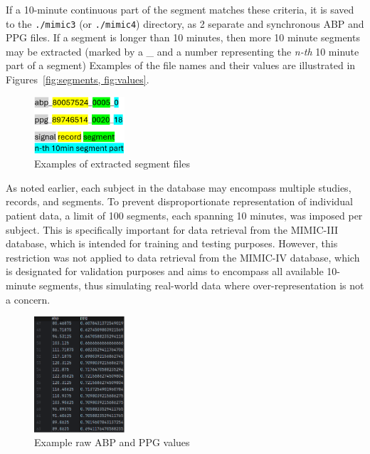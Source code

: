 If a 10-minute continuous part of the segment matches these criteria, it is saved to the \texttt{./mimic3} (or \texttt{./mimic4}) directory, as 2 separate and synchronous ABP and PPG files.
If a segment is longer than 10 minutes, then more 10 minute segments may be extracted (marked by a \_ and a number representing the \textit{n-th} 10 minute part of a segment)
Examples of the file names and their values are illustrated in Figures~\ref{fig:segments, fig:values}.

\begin{figure}
    \vspace*{-10mm}
    \begin{center}
        \includegraphics[width=0.3\textwidth]{images/methods/segments}
    \end{center}
    \vspace*{-7mm}
    \captionsetup{format=plain, justification=centering}
    \caption{\small Examples of extracted segment files}
    \label{fig:segments}
\end{figure}

As noted earlier, each subject in the database may encompass multiple studies, records, and segments.
To prevent disproportionate representation of individual patient data, a limit of 100 segments, each spanning 10 minutes, was imposed per subject.
This is specifically important for data retrieval from the MIMIC-III database, which is intended for training and testing purposes.
However, this restriction was not applied to data retrieval from the MIMIC-IV database, which is designated for validation purposes and aims to encompass all available 10-minute segments, thus simulating real-world data where over-representation is not a concern.

\begin{figure}
    \vspace*{-5mm}
    \begin{center}
        \includegraphics[width=0.3\textwidth]{images/methods/values}
    \end{center}
    \vspace*{-7mm}
    \captionsetup{format=plain, justification=centering}
    \caption{\small Example raw ABP and PPG values}
    \label{fig:values}
\end{figure}

